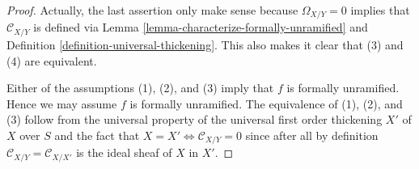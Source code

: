 \documentclass[10pt,a4paper]{amsart}
\theoremstyle{plain}
\theoremstyle{definition}
\theoremstyle{remark}
\numberwithin{equation}{subsection}
\begin{document}
\begin{proof}
Actually, the last assertion only make sense because $\Omega_{X/Y} = 0$
implies that $\mathcal{C}_{X/Y}$ is defined via
Lemma \ref{lemma-characterize-formally-unramified}
and
Definition \ref{definition-universal-thickening}.
This also makes it clear that (3) and (4) are equivalent.

\medskip\noindent
Either of the assumptions (1), (2), and (3) imply that $f$ is formally
unramified. Hence we may assume $f$ is formally unramified. The equivalence
of (1), (2), and (3) follow from the universal property of the universal
first order thickening $X'$ of $X$ over $S$ and the fact that
$X = X' \Leftrightarrow \mathcal{C}_{X/Y} = 0$ since
after all by definition $\mathcal{C}_{X/Y} = \mathcal{C}_{X/X'}$
is the ideal sheaf of $X$ in $X'$.
\end{proof}
\end{document}

